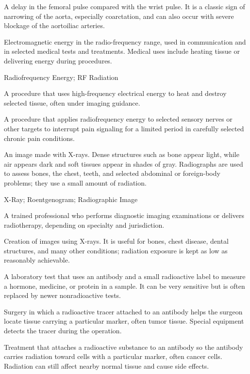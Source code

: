  A delay in the femoral pulse compared with the wrist pulse. It is a classic sign of narrowing of the aorta, especially coarctation, and can also occur with severe blockage of the aortoiliac arteries.

 Electromagnetic energy in the radio-frequency range, used in communication and in selected medical tests and treatments. Medical uses include heating tissue or delivering energy during procedures.

\synonyms
Radiofrequency Energy; RF Radiation

 A procedure that uses high-frequency electrical energy to heat and destroy selected tissue, often under imaging guidance.

 A procedure that applies radiofrequency energy to selected sensory nerves or other targets to interrupt pain signaling for a limited period in carefully selected chronic pain conditions.

 An image made with X-rays. Dense structures such as bone appear light, while air appears dark and soft tissues appear in shades of gray. Radiographs are used to assess bones, the chest, teeth, and selected abdominal or foreign-body problems; they use a small amount of radiation.

\synonyms
X-Ray; Roentgenogram; Radiographic Image

 A trained professional who performs diagnostic imaging examinations or delivers radiotherapy, depending on specialty and jurisdiction.

 Creation of images using X-rays. It is useful for bones, chest disease, dental structures, and many other conditions; radiation exposure is kept as low as reasonably achievable.

 A laboratory test that uses an antibody and a small radioactive label to measure a hormone, medicine, or protein in a sample. It can be very sensitive but is often replaced by newer nonradioactive tests.

 Surgery in which a radioactive tracer attached to an antibody helps the surgeon locate tissue carrying a particular marker, often tumor tissue. Special equipment detects the tracer during the operation.

 Treatment that attaches a radioactive substance to an antibody so the antibody carries radiation toward cells with a particular marker, often cancer cells. Radiation can still affect nearby normal tissue and cause side effects.

